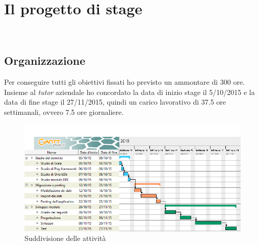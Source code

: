 
\chapter{Il progetto di stage}
\label{cap:il-progetto-di-stage}
\\




\section{Organizzazione}
Per conseguire tutti gli obiettivi fissati ho previsto un ammontare di 300 ore. Insieme al \emph{tutor} aziendale ho concordato la data di inizio stage il 5/10/2015 e la data di fine stage il 27/11/2015, quindi un carico lavorativo di 37.5 ore settimanali, ovvero 7.5 ore giornaliere. 
\begin{figure}[h]
\centering
\includegraphics[scale=0.52]{immagini/gantt}
\caption{Suddivisione delle attività}
\label{fig:gantt}
\end{figure}
\newpage
